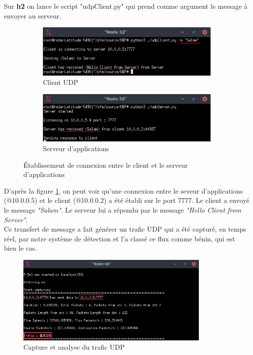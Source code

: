 Sur \textbf{h2} on lance le script "udpClient.py" qui prend comme argument le message à envoyer au serveur.
\begin{figure}[h]
\centering
\begin{subfigure}{12.5cm}
\centering
\includegraphics[width=\textwidth]{Figures/simulation/mininet/UDP/client/Benign}
\caption{Client UDP}
\end{subfigure}
\vskip 0.4cm
\begin{subfigure}{12.5cm}
\centering
\includegraphics[width=\textwidth]{Figures/simulation/mininet/UDP/server/benign_request}
\caption{Serveur d'applications}
\end{subfigure}
\vskip 0.3cm
\decoRule
\caption{Établissement de connexion entre le client et le serveur d'applications}
\label{fig:c/s_UDP}
\end{figure}
\newpage
D'après la figure \ref{fig:c/s_UDP}, on peut voir qu'une connexion entre le seveur d'applications (@10.0.0.5) et le client (@10.0.0.2) a été établi sur le port 7777. Le client a envoyé le message \textit{"Salam"}. Le serveur lui a répondu par le message \textit{"Hello Client from Server"}. \\
Ce transfert de message a fait générer un trafic UDP qui a été capturé, en temps réel, par notre système de détection et l'a classé ce flux comme bénin, qui est bien le cas. 
\begin{figure}[h]
\centering
\includegraphics[width=0.85\textwidth]{Figures/simulation/mininet/IDS/benign_udp}
\decoRule
\caption{Capture et analyse du trafic UDP}
\label{fig:udpTraffic}
\end{figure}
